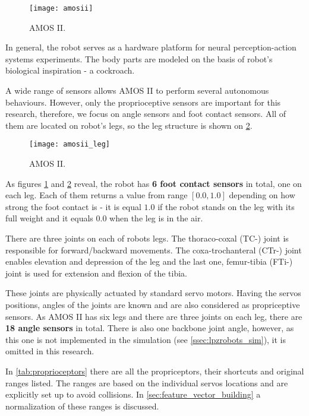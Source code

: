 \begin{figure}[H]
  \centering
  \texttt{[image: amosii]}
  \caption{AMOS II. \citep{misc:amosii}}
  \label{img:amosii}
\end{figure}

In general, the robot serves as a hardware platform for neural perception-action systems experiments. The body parts are modeled on the basis of robot's biological inspiration - a cockroach.

A wide range of sensors allows AMOS II to perform several autonomous behaviours. However, only the proprioceptive sensors are important for this research, therefore, we focus on angle sensors and foot contact sensors. All of them are located on robot's legs, so the leg structure is shown on \cref{img:amosii_leg}.

\begin{figure}[H]
  \centering
  \texttt{[image: amosii\_leg]}
  \caption{AMOS II. \citep{misc:amosii}}
  \label{img:amosii_leg}
\end{figure}

As figures \ref{img:amosii} and \ref{img:amosii_leg} reveal, the robot has \textbf{6 foot contact sensors} in total, one on each leg. Each of them returns a value from range $ [0.0, 1.0] $ depending on how strong the foot contact is - it is equal $ 1.0 $ if the robot stands on the leg with its full weight and it equals $ 0.0 $ when the leg is in the air.

There are three joints on each of robots legs. The thoraco-coxal (TC-) joint is responsible for forward/backward movements. The coxa-trochanteral (CTr-) joint enables elevation and depression of the leg and the last one, femur-tibia (FTi-) joint is used for extension and flexion of the tibia.

These joints are physically actuated by standard servo motors. Having the servos positions, angles of the joints are known and are also considered as propriceptive sensors. As AMOS II has six legs and there are three joints on each leg, there are \textbf{18 angle sensors} in total. There is also one backbone joint angle, however, as this one is not implemented in the simulation (see \cref{ssec:lpzrobots_sim}), it is omitted in this research.

In \cref{tab:proprioceptors} there are all the propriceptors, their shortcuts and original ranges listed. The ranges are based on the individual servos locations and are explicitly set up to avoid collisions. In \cref{sec:feature_vector_building} a normalization of these ranges is discussed.

